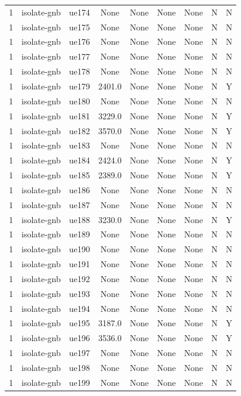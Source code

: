 \begin{table}[ht]
\begin{tabular}{|c|c|c|c|c|c|c|c|c|}
1 & isolate-gnb & ue174 & None & None & None & None & N & N \\
1 & isolate-gnb & ue175 & None & None & None & None & N & N \\
1 & isolate-gnb & ue176 & None & None & None & None & N & N \\
1 & isolate-gnb & ue177 & None & None & None & None & N & N \\
1 & isolate-gnb & ue178 & None & None & None & None & N & N \\
1 & isolate-gnb & ue179 & 2401.0 & None & None & None & N & Y \\
1 & isolate-gnb & ue180 & None & None & None & None & N & N \\
1 & isolate-gnb & ue181 & 3229.0 & None & None & None & N & Y \\
1 & isolate-gnb & ue182 & 3570.0 & None & None & None & N & Y \\
1 & isolate-gnb & ue183 & None & None & None & None & N & N \\
1 & isolate-gnb & ue184 & 2424.0 & None & None & None & N & Y \\
1 & isolate-gnb & ue185 & 2389.0 & None & None & None & N & Y \\
1 & isolate-gnb & ue186 & None & None & None & None & N & N \\
1 & isolate-gnb & ue187 & None & None & None & None & N & N \\
1 & isolate-gnb & ue188 & 3230.0 & None & None & None & N & Y \\
1 & isolate-gnb & ue189 & None & None & None & None & N & N \\
1 & isolate-gnb & ue190 & None & None & None & None & N & N \\
1 & isolate-gnb & ue191 & None & None & None & None & N & N \\
1 & isolate-gnb & ue192 & None & None & None & None & N & N \\
1 & isolate-gnb & ue193 & None & None & None & None & N & N \\
1 & isolate-gnb & ue194 & None & None & None & None & N & N \\
1 & isolate-gnb & ue195 & 3187.0 & None & None & None & N & Y \\
1 & isolate-gnb & ue196 & 3536.0 & None & None & None & N & Y \\
1 & isolate-gnb & ue197 & None & None & None & None & N & N \\
1 & isolate-gnb & ue198 & None & None & None & None & N & N \\
1 & isolate-gnb & ue199 & None & None & None & None & N & N \\

\end{tabular}
\end{table}
